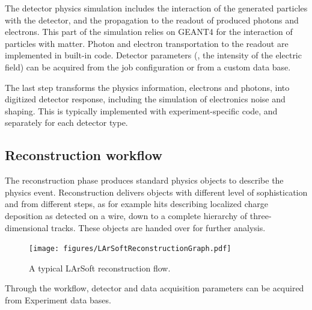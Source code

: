 The detector physics simulation includes the interaction of the
generated particles with the detector, and the propagation to the
readout of produced photons and electrons. This part of the simulation
relies on GEANT4 for the interaction of particles with matter. Photon
and electron transportation to the readout are implemented in built-in
code. Detector parameters (\eg, the intensity of the electric field)
can be acquired from the job configuration or from a custom data base.

The last step transforms the physics information, electrons and photons,
into digitized detector response, including the simulation of
electronics noise and shaping. This is typically implemented with
experiment-specific code, and separately for each detector type.


\subsection{Reconstruction workflow}
\label{ssec:Workflows:Reconstruction}

The reconstruction phase produces standard physics objects to describe
the physics event. Reconstruction delivers objects with different level
of sophistication and from different steps, as for example hits
describing localized charge deposition as detected on a wire, down to a
complete hierarchy of three-dimensional tracks. These objects are handed
over for further analysis.
\begin{figure}[htbp]
  \centering
  \texttt{[image: figures/LArSoftReconstructionGraph.pdf]}
  \caption{\label{fig:LArSoftReconstruction}A typical LArSoft reconstruction flow.}
\end{figure}
Through the workflow, detector and data acquisition parameters
can be acquired from Experiment data bases.

